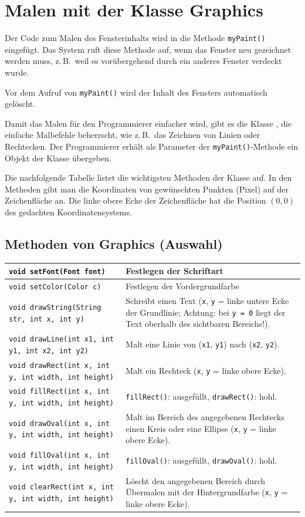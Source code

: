 \section{Malen mit der Klasse Graphics}

Der Code zum Malen des Fensterinhalts wird in die Methode \lstinline|myPaint()|
eingefügt. Das System ruft diese Methode auf, wenn das Fenster neu gezeichnet
werden muss, z.\,B.\ weil es vorübergehend durch ein anderes Fenster verdeckt
wurde. 

Vor dem Aufruf von \lstinline|myPaint()| wird der Inhalt des Fensters
automatisch gelöscht.

Damit das Malen für den Programmierer einfacher wird, gibt es die Klasse
, die einfache Malbefehle beherrscht, wie z.\,B.\ das Zeichnen
von Linien oder Rechtecken. Der Programmierer erhält als Parameter der
\lstinline|myPaint()|-Methode ein Objekt der Klasse 
übergeben.

Die nachfolgende Tabelle listet die wichtigsten Methoden der Klasse
 auf. In den Methoden gibt man die Koordinaten von gewünschten
Punkten (Pixel) auf der Zeichenfläche an. Die linke obere Ecke der
Zeichenfläche hat die Position $(0, 0)$ des gedachten Koordinatensystems.

\subsection{Methoden von Graphics (Auswahl)}

\begin{tabularx}{\textwidth}{|l|X|}
\hline
\texttt{void setFont(Font font)} & Festlegen der Schriftart \\ \hline
\texttt{void setColor(Color c)} & Festlegen der Vordergrundfarbe \\ \hline
\texttt{void drawString(String str, int x, int y)} & Schreibt einen Text
(\texttt{x}, \texttt{y} = linke untere Ecke der Grundlinie; Achtung: bei
\texttt{y = 0} liegt der Text oberhalb des sichtbaren Bereichs!). \\ \hline
\texttt{void drawLine(int x1, int y1, int x2, int y2)} & Malt eine Linie von
(\texttt{x1}, \texttt{y1}) nach (\texttt{x2}, \texttt{y2}). \\ \hline
\texttt{void drawRect(int x, int y, int width, int height)} & Malt ein
Rechteck (\texttt{x}, \texttt{y} = linke obere Ecke). \\
\texttt{void fillRect(int x, int y, int width, int height)} &
\texttt{fillRect()}: ausgefüllt, \texttt{drawRect()}: hohl. \\ \hline
\texttt{void drawOval(int x, int y, int width, int height)} & Malt im Bereich
des angegebenen Rechtecks einen Kreis oder eine Ellipse (\texttt{x}, \texttt{y}
= linke obere Ecke). \\
\texttt{void fillOval(int x, int y, int width, int height)} &
\texttt{fillOval()}: ausgefüllt, \texttt{drawOval()}: hohl. \\ \hline
\texttt{void clearRect(int x, int y, int width, int height)} & Löscht den
angegebenen Bereich durch Übermalen mit der Hintergrundfarbe (\texttt{x},
\texttt{y} = linke obere Ecke). \\ \hline
\end{tabularx}
